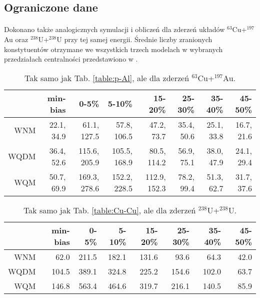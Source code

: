 \documentclass[a4paper,12pt]{article}
\begin{document}
\subsection{Ograniczone dane}
\paragraph{}
Dokonano także analogicznych symulacji i obliczeń dla zderzeń układów $^{63}$Cu+$^{197}$Au oraz $^{238}$U+$^{238}$U przy tej samej energii. Średnie liczby zranionych konstytuentów otrzymane we wszystkich trzech modelach w wybranych przedziałach centralności przedstawiono w .

\begin{table}[H]\centering
\begin{tabular}{|r|r|r|r|r|r|r|r|} \hline
& min-bias & 0-5\% & 5-10\% & 15-20\% & 25-30\% & 35-40\% & 45-50\% \\ \hline
WNM  & 22.1, 34.9 & 61.1, 127.5 & 57.8, 106.5 & 47.2, 73.7 & 35.4, 50.6 & 25.1, 33.8 & 16.7, 21.6 \\ \hline
WQDM & 36.4, 52.6 & 115.6, 205.9 & 105.5, 168.9 & 80.5, 114.2 & 56.9, 75.1 & 38.0, 47.9 & 24.1, 29.4 \\ \hline
WQM  & 50.7, 69.9 & 169.3, 278.6 & 152.2, 228.5 & 112.9, 152.3 & 78.2, 99.4 & 51.3, 62.7 & 31.7, 37.6 \\ \hline
\end{tabular}
\caption{Tak samo jak Tab. \ref{table:p-Al}, ale dla zderzeń $^{63}$Cu+$^{197}$Au.}\label{table:Cu-Au}
\end{table}
\begin{table}[H]\centering
\begin{tabular}{|r|r|r|r|r|r|r|r|} \hline
& min-bias & 0-5\% & 5-10\% & 15-20\% & 25-30\% & 35-40\% & 45-50\% \\ \hline
WNM  & 62.0 & 211.5 & 182.1 & 131.6 & 93.6 & 64.3 & 42.0 \\ \hline
WQDM & 104.5 & 389.1 & 324.8 & 225.2 & 154.6 & 102.0 & 63.7 \\ \hline
WQM  & 146.8 & 563.4 & 464.6 & 319.7 & 216.1 & 140.5 & 85.9 \\ \hline
\end{tabular}
\caption{Tak samo jak Tab. \ref{table:Cu-Cu}, ale dla zderzeń $^{238}$U+$^{238}$U.}\label{table:U-U}

\end{table}
\end{document}
